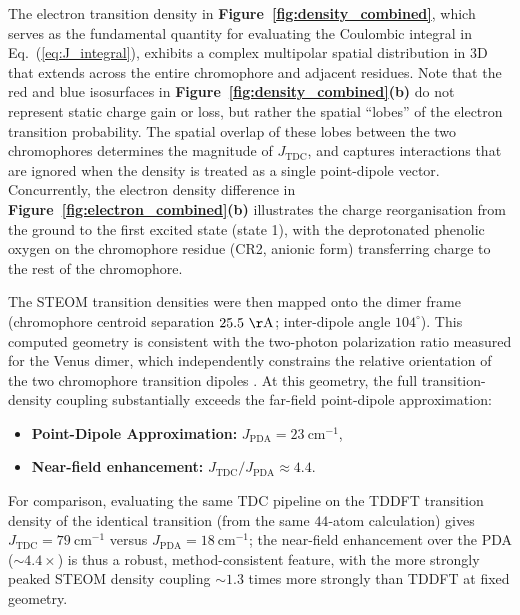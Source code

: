 \documentclass[journal=jpcbfk, manuscript=article, layout=twocolumn, doi=true]{achemso}
\begin{document}
The electron transition density in \textbf{Figure~\ref{fig:density_combined}}, which serves as the fundamental quantity for evaluating the Coulombic integral in Eq.~(\ref{eq:J_integral}), exhibits a complex multipolar spatial distribution in 3D that extends across the entire chromophore and adjacent residues. Note that the red and blue isosurfaces in \textbf{Figure~\ref{fig:density_combined}(b)} do not represent static charge gain or loss, but rather the spatial ``lobes'' of the electron transition probability. The spatial overlap of these lobes between the two chromophores determines the magnitude of $J_{\text{TDC}}$, and captures interactions that are ignored when the density is treated as a single point-dipole vector. Concurrently, the electron density difference in \textbf{Figure~\ref{fig:electron_combined}(b)} illustrates the charge reorganisation from the ground to the first excited state (state 1), with the deprotonated phenolic oxygen on the chromophore residue (CR2, anionic form) transferring charge to the rest of the chromophore. 

The STEOM transition densities were then mapped onto the dimer frame (chromophore centroid separation $25.5~\mathrm{\AA}$; inter-dipole angle $104^{\circ}$). This computed geometry is consistent with the two-photon polarization ratio measured for the Venus dimer, which independently constrains the relative orientation of the two chromophore transition dipoles \cite{cusick2026polarization}. At this geometry, the full transition-density coupling substantially exceeds the far-field point-dipole approximation:

{\sloppy\setlength{\leftmargini}{1em}
\begin{itemize}
    \item \textbf{Point-Dipole Approximation:} $J_{\text{PDA}} = 23~\mathrm{cm^{-1}}$,
    \item \textbf{Near-field enhancement:} $J_{\text{TDC}}/J_{\text{PDA}} \approx 4.4$.
\end{itemize}}

\noindent For comparison, evaluating the same TDC pipeline on the TDDFT transition density of the identical transition (from the same $44$-atom calculation) gives $J_{\text{TDC}} = 79~\mathrm{cm^{-1}}$ versus $J_{\text{PDA}} = 18~\mathrm{cm^{-1}}$; the near-field enhancement over the PDA (${\sim}4.4\times$) is thus a robust, method-consistent feature, with the more strongly peaked STEOM density coupling ${\sim}1.3$ times more strongly than TDDFT at fixed geometry.
\end{document}
